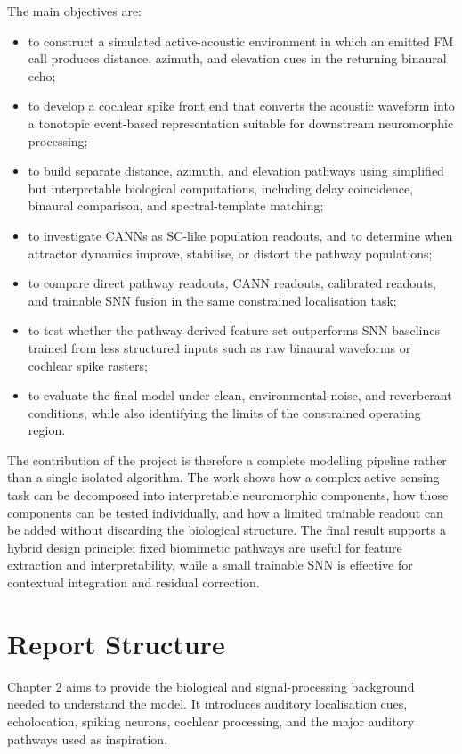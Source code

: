The main objectives are:
\begin{itemize}
    \item to construct a simulated active-acoustic environment in which an emitted FM call produces distance, azimuth, and elevation cues in the returning binaural echo;
    \item to develop a cochlear spike front end that converts the acoustic waveform into a tonotopic event-based representation suitable for downstream neuromorphic processing;
    \item to build separate distance, azimuth, and elevation pathways using simplified but interpretable biological computations, including delay coincidence, binaural comparison, and spectral-template matching;
    \item to investigate CANNs as SC-like population readouts, and to determine when attractor dynamics improve, stabilise, or distort the pathway populations;
    \item to compare direct pathway readouts, CANN readouts, calibrated readouts, and trainable SNN fusion in the same constrained localisation task;
    \item to test whether the pathway-derived feature set outperforms SNN baselines trained from less structured inputs such as raw binaural waveforms or cochlear spike rasters;
    \item to evaluate the final model under clean, environmental-noise, and reverberant conditions, while also identifying the limits of the constrained operating region.
\end{itemize}

The contribution of the project is therefore a complete modelling pipeline rather than a single isolated algorithm. The work shows how a complex active sensing task can be decomposed into interpretable neuromorphic components, how those components can be tested individually, and how a limited trainable readout can be added without discarding the biological structure. The final result supports a hybrid design principle: fixed biomimetic pathways are useful for feature extraction and interpretability, while a small trainable SNN is effective for contextual integration and residual correction.


\section{Report Structure}

Chapter 2 aims to provide the biological and signal-processing background needed to understand the model. It introduces auditory localisation cues, echolocation, spiking neurons, cochlear processing, and the major auditory pathways used as inspiration.

